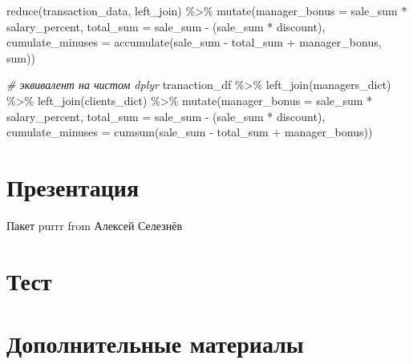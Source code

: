 \documentclass[
]{book}
\newenvironment{Shaded}{\begin{snugshade}}{\end{snugshade}}
\newcommand{\AttributeTok}[1]{\textcolor[rgb]{0.77,0.63,0.00}{#1}}
\newcommand{\CommentTok}[1]{\textcolor[rgb]{0.56,0.35,0.01}{\textit{#1}}}
\newcommand{\FunctionTok}[1]{\textcolor[rgb]{0.00,0.00,0.00}{#1}}
\newcommand{\NormalTok}[1]{#1}
\newcommand{\SpecialCharTok}[1]{\textcolor[rgb]{0.00,0.00,0.00}{#1}}
\begin{document}
\begin{Shaded}
\begin{Highlighting}[]
\FunctionTok{reduce}\NormalTok{(transaction\_data, left\_join) }\SpecialCharTok{\%\textgreater{}\%}
  \FunctionTok{mutate}\NormalTok{(}\AttributeTok{manager\_bonus =}\NormalTok{ sale\_sum }\SpecialCharTok{*}\NormalTok{ salary\_percent,}
         \AttributeTok{total\_sum =}\NormalTok{ sale\_sum }\SpecialCharTok{{-}}\NormalTok{ (sale\_sum }\SpecialCharTok{*}\NormalTok{ discount),}
         \AttributeTok{cumulate\_minuses =} \FunctionTok{accumulate}\NormalTok{(sale\_sum }\SpecialCharTok{{-}}\NormalTok{ total\_sum }\SpecialCharTok{+}\NormalTok{ manager\_bonus, sum))}

\CommentTok{\# эквивалент на чистом dplyr}
\NormalTok{tranaction\_df }\SpecialCharTok{\%\textgreater{}\%}
  \FunctionTok{left\_join}\NormalTok{(managers\_dict) }\SpecialCharTok{\%\textgreater{}\%}
  \FunctionTok{left\_join}\NormalTok{(clients\_dict) }\SpecialCharTok{\%\textgreater{}\%}
  \FunctionTok{mutate}\NormalTok{(}\AttributeTok{manager\_bonus =}\NormalTok{ sale\_sum }\SpecialCharTok{*}\NormalTok{ salary\_percent,}
         \AttributeTok{total\_sum =}\NormalTok{ sale\_sum }\SpecialCharTok{{-}}\NormalTok{ (sale\_sum }\SpecialCharTok{*}\NormalTok{ discount),}
         \AttributeTok{cumulate\_minuses =} \FunctionTok{cumsum}\NormalTok{(sale\_sum }\SpecialCharTok{{-}}\NormalTok{ total\_sum }\SpecialCharTok{+}\NormalTok{ manager\_bonus))}
\end{Highlighting}
\end{Shaded}

\hypertarget{ux43fux440ux435ux437ux435ux43dux442ux430ux446ux438ux44f-2}{%
\section{Презентация}\label{ux43fux440ux435ux437ux435ux43dux442ux430ux446ux438ux44f-2}}

Пакет purrr from Алексей Селезнёв

\hypertarget{ux442ux435ux441ux442-3}{%
\section{Тест}\label{ux442ux435ux441ux442-3}}

\hypertarget{ux434ux43eux43fux43eux43bux43dux438ux442ux435ux43bux44cux43dux44bux435-ux43cux430ux442ux435ux440ux438ux430ux43bux44b-1}{%
\section{Дополнительные материалы}\label{ux434ux43eux43fux43eux43bux43dux438ux442ux435ux43bux44cux43dux44bux435-ux43cux430ux442ux435ux440ux438ux430ux43bux44b-1}}
\end{document}
